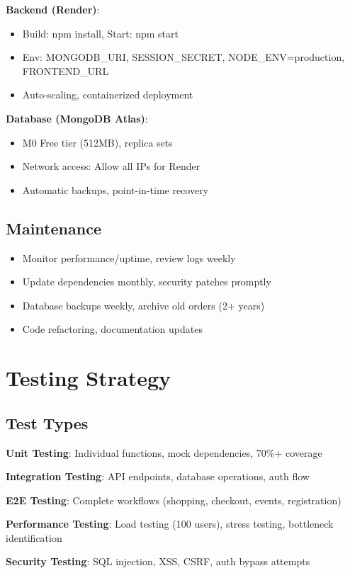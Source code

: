 \documentclass[11pt]{scrreprt}
\begin{document}
\textbf{Backend (Render)}:
\begin{itemize}
\item Build: npm install, Start: npm start
\item Env: MONGODB\_URI, SESSION\_SECRET, NODE\_ENV=production, FRONTEND\_URL
\item Auto-scaling, containerized deployment
\end{itemize}

\textbf{Database (MongoDB Atlas)}:
\begin{itemize}
\item M0 Free tier (512MB), replica sets
\item Network access: Allow all IPs for Render
\item Automatic backups, point-in-time recovery
\end{itemize}

\section{Maintenance}
\begin{itemize}
\item Monitor performance/uptime, review logs weekly
\item Update dependencies monthly, security patches promptly
\item Database backups weekly, archive old orders (2+ years)
\item Code refactoring, documentation updates
\end{itemize}

\chapter{Testing Strategy}

\section{Test Types}
\textbf{Unit Testing}: Individual functions, mock dependencies, 70\%+ coverage

\textbf{Integration Testing}: API endpoints, database operations, auth flow

\textbf{E2E Testing}: Complete workflows (shopping, checkout, events, registration)

\textbf{Performance Testing}: Load testing (100 users), stress testing, bottleneck identification

\textbf{Security Testing}: SQL injection, XSS, CSRF, auth bypass attempts
\end{document}
